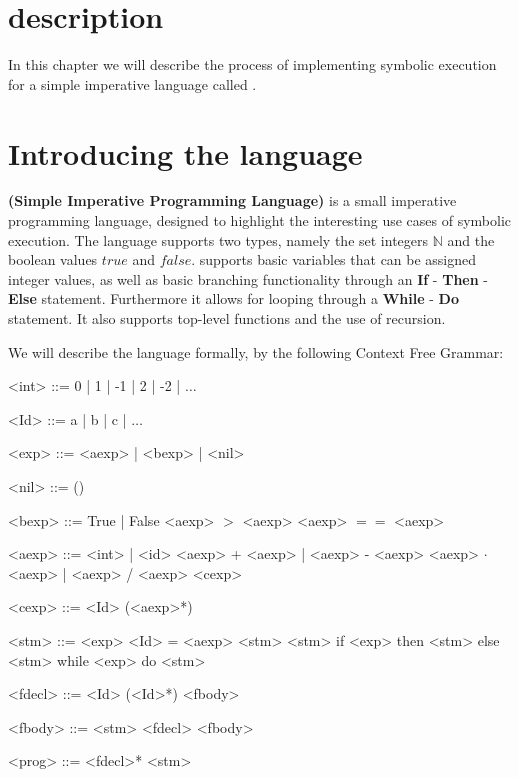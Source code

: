 \section{description}

In this chapter we will describe the process of implementing symbolic execution for a simple imperative language called \simpl.

\section{Introducing the \simpl language}

\simpl\textbf{(Simple Imperative Programming Language)} is a small imperative programming language, designed to highlight the interesting use cases of symbolic execution. The language supports two types, namely the set integers $\mathbb{N}$ and the boolean values $true$ and $false$.
 \simpl supports basic
 variables that can be assigned integer values, as well as basic branching functionality through an \textbf{If} - \textbf{Then} - \textbf{Else} statement. Furthermore it allows for looping through a \textbf{While} - \textbf{Do} statement. It also supports top-level functions and the use of recursion.

We will describe the language formally, by the following Context Free Grammar:

\newpage
\begin{grammar}
	<int> ::= 0 | 1 | -1 | 2 | -2 | $\ldots$
	
	<Id> ::= a | b | c | $\ldots$ 
	
	<exp> ::= <aexp> | <bexp> | <nil>
	
	<nil> ::= ()
	
	<bexp> ::= True | False
	\alt <aexp> $>$ <aexp>
	\alt <aexp> $==$ <aexp>
	
	<aexp> ::= <int> | <id>
	\alt <aexp> + <aexp> | <aexp> - <aexp> 
	\alt <aexp> $\cdot$ <aexp> | <aexp> / <aexp>
	\alt <cexp>
	
	<cexp> ::= <Id> (<aexp>*) 
	
	<stm> ::= <exp>
	\alt <Id> = <aexp>
	\alt <stm> <stm>
	\alt if <exp> then <stm> else <stm>
	\alt while <exp> do <stm>
	
	<fdecl> ::= <Id> (<Id>*) {<fbody>}
	
	<fbody> ::= <stm>
	\alt <fdecl> <fbody>
	
	<prog> ::= <fdecl>* <stm>
	
\end{grammar}

